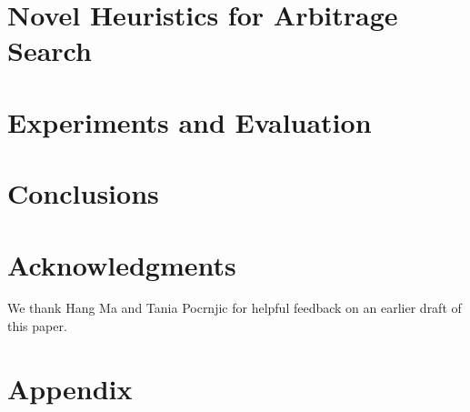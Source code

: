 \documentclass[10pt]{cai26}
\begin{document}
\section{Novel Heuristics for Arbitrage Search}


\section{Experiments and Evaluation}


\section{Conclusions}


\section*{Acknowledgments}
We thank Hang Ma and Tania Pocrnjic for helpful feedback on an earlier draft of this paper.

\printbibliography[heading=subbibintoc]

\appendix
\section{Appendix}

\end{document}
